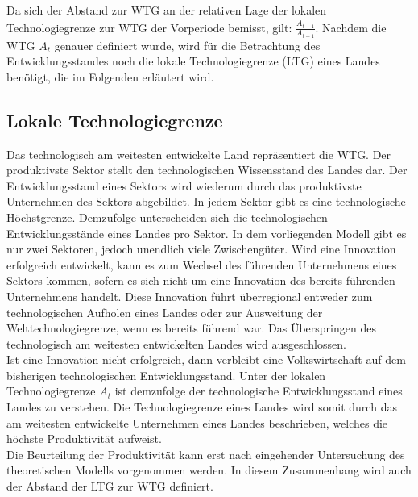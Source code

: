 \bigskip
Da sich der Abstand zur WTG an der relativen Lage der lokalen Technologiegrenze zur WTG der Vorperiode bemisst, gilt: $\frac{\overline{A}_{t-1}}{A_{t-1}}$. Nachdem die WTG $\overline{A}_{t}$ genauer definiert wurde, wird für die Betrachtung des Entwicklungsstandes noch die lokale Technologiegrenze (LTG) eines Landes benötigt, die im Folgenden erläutert wird.



\subsection{Lokale Technologiegrenze}
Das technologisch am weitesten entwickelte Land repräsentiert die WTG. Der produktiv\-ste Sektor stellt den technologischen Wissensstand des Landes dar. Der Entwicklungsstand eines Sektors wird wiederum durch das produktivste Unternehmen des Sektors abgebildet. 
In jedem Sektor gibt es eine technologische Höchstgrenze. Demzufolge unterscheiden sich die technologischen Entwicklungsstände eines Landes pro Sektor. In dem vorliegenden Modell gibt es nur zwei Sektoren, jedoch unendlich viele Zwischengüter. Wird eine Innovation erfolgreich entwickelt, kann es zum Wechsel des führenden Unternehmens eines Sektors kommen, sofern es sich nicht um eine Innovation des bereits führenden Unternehmens handelt. Diese Innovation führt überregional entweder zum technologischen Aufholen eines Landes oder zur Ausweitung der Welttechnologiegrenze, wenn es bereits führend war. Das Überspringen des technologisch am weitesten entwickelten Landes wird ausgeschlossen.\\
Ist eine Innovation nicht erfolgreich, dann verbleibt eine Volkswirtschaft auf dem bisherigen technologischen Entwicklungsstand. Unter der lokalen Technologiegrenze $A_t$ ist demzufolge der technologische Entwicklungsstand eines Landes zu verstehen. Die Technologiegrenze eines Landes wird somit durch das am weitesten entwickelte Unternehmen eines Landes beschrieben, welches die höchste Produktivität aufweist.\\ 


Die Beurteilung der Produktivität kann erst nach eingehender Untersuchung des theoretischen Modells vorgenommen werden. In diesem Zusammenhang wird auch der Abstand der LTG zur WTG definiert.



